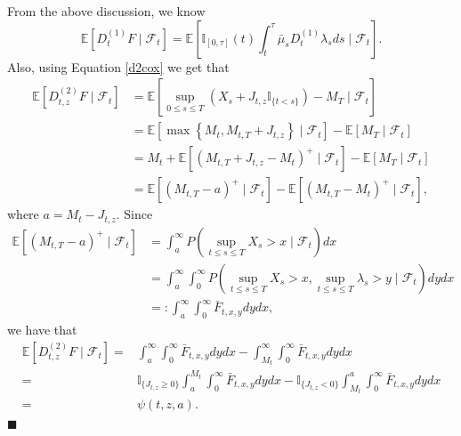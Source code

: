 \documentclass[10pt,a4paper]{amsart}
\newenvironment{Proof}{\noindent{\bf Proof.}}{\hfill{$\blacksquare$}}
\begin{document}
\begin{Proof}
From the above discussion, we know 
$$
\mathbb{E}\left[D_{t}^{(1)} F \mid \mathcal{F}_{t}\right]= \mathbb{E}\left[\mathbb{I}_{[0, \tau]}(t)\int_t^\tau \bar{\mu}_s D_t^{(1)}\lambda_s ds\mid \mathcal{F}_{t}\right].
$$
Also, using Equation \eqref{d2cox} we get that
\begin{align*}
\mathbb{E}\left[D_{t, z}^{(2)} F \mid \mathcal{F}_{t}\right] & =\mathbb{E}\left[\sup _{0 \leq s \leq T}\left(X_{s}+J_{t,z} \mathbb{I}_{\{t<s\}}\right)-M_{T} \mid \mathcal{F}_{t}\right] \\
& =\mathbb{E}\left[\max \left\{M_{t}, M_{t, T}+J_{t,z}\right\} \mid \mathcal{F}_{t}\right]-\mathbb{E}\left[M_{T} \mid \mathcal{F}_{t}\right] \\
& =M_{t}+\mathbb{E}\left[\left(M_{t, T}+J_{t,z}-M_{t}\right)^{+} \mid \mathcal{F}_{t}\right]-\mathbb{E}\left[M_{T} \mid \mathcal{F}_{t}\right] \\
& =\mathbb{E}\left[\left(M_{t, T}-a\right)^{+} \mid \mathcal{F}_{t}\right]-\mathbb{E}\left[(M_{t, T} - M_t )^{+} \mid \mathcal{F}_{t}\right],
\end{align*}
where $a=M_{t}-J_{t,z}$. Since 
\begin{align*}
\mathbb{E}\left[\left(M_{t, T}-a\right)^{+} \mid \mathcal{F}_{t}\right]  &=\int_{a}^{\infty}  P(\sup_{t \leq s \leq T}X_s > x \mid  \mathcal{F}_{t})d x\\
& =\int_{a}^{\infty} \int_{0}^{\infty}  P(\sup_{t \leq s \leq T}X_s > x , \sup_{t \le s \le T}\lambda_s > y \mid  \mathcal{F}_{t})dy d x\\
&=: \int_{a}^{\infty}\int_{0}^{\infty} \bar{F}_{t, x, y}dy d x,
\end{align*}
we have that
\begin{align*}
\mathbb{E}\left[D_{t, z}^{(2)} F \mid \mathcal{F}_{t}\right] = & \int_{a}^{\infty}\int_{0}^{\infty} \bar{F}_{t, x, y}dy d x- \int_{M_t}^{\infty}\int_{0}^{\infty} \bar{F}_{t, x, y}dy d x\\
= & \mathbb{I}_{\{J_{t,z} \geq 0\}}\int_{a}^{M_t} \int_{0}^{\infty}\bar{F}_{t, x, y}dy d x -  \mathbb{I}_{\{J_{t,z} < 0\}}\int_{M_t}^{a} \int_{0}^{\infty}\bar{F}_{t, x, y}dy d x\\
=& \psi(t, z, a).
\end{align*}
\end{Proof}
\end{document}
